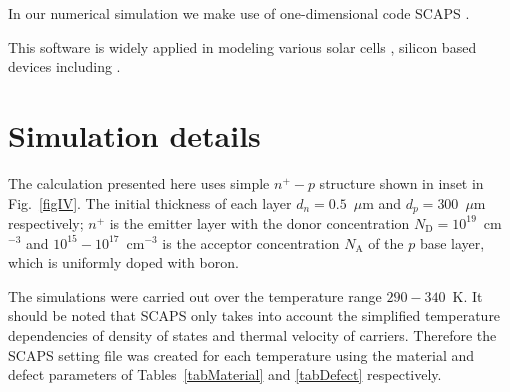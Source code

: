\documentclass [sort&compress] {elsarticle}
\begin{document}
In our numerical simulation we make use of one-dimensional code SCAPS \cite{SCAPS1,SCAPS2}.

This software is widely applied in modeling various solar cells \cite{SCAPSuse1,SCAPSuse2,SCAPSuse3,SCAPSuse5,SCAPSuseSi1,SCAPSuseSi4,SCAPSuseSi3},
silicon based devices including \cite{SCAPSuseSi1,
SCAPSuseSi3,SCAPSuseSi4}.


\section{Simulation details}
The calculation presented here uses simple $n^+-p$ structure shown in inset in Fig.~\ref{figIV}.
The initial thickness of each layer $d_n=0.5$~$\mu$m and $d_p=300$~$\mu$m respectively;
$n^+$ is the emitter layer with the donor concentration $N_\mathrm{D}=10^{19}$~cm$^{-3}$ and $10^{15}-10^{17}$~cm$^{-3}$ is the acceptor concentration $N_\mathrm{A}$ of the $p$ base layer,
which is uniformly doped with boron.


The simulations  were carried out over the temperature range $290-340$~K.
It should be noted that SCAPS only takes into account the simplified temperature dependencies of density of states
and  thermal  velocity of carriers.
Therefore the SCAPS setting file was created for each temperature using the material and defect parameters of Tables~\ref{tabMaterial} and \ref{tabDefect} respectively.
\end{document}
